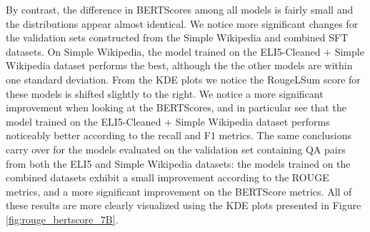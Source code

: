 \documentclass[11pt, oneside]{article}   	%
\begin{document}
By contrast, the difference in BERTScores among all models is fairly small and the distributions appear almost identical.
We notice more significant changes for the validation sets constructed from the Simple Wikipedia and combined SFT datasets.
On Simple Wikipedia, the model trained on the ELI5-Cleaned + Simple Wikipedia dataset performs the best, although the the other models are within one standard deviation.
From the KDE plots we notice the RougeLSum score for these models is shifted slightly to the right. 
We notice a more significant improvement when looking at the BERTScores, and in particular see that the model trained on the ELI5-Cleaned + Simple Wikipedia dataset performs noticeably better according to the recall and F1 metrics.
The same conclusions carry over for the models evaluated on the validation set containing QA pairs from both the ELI5 and Simple Wikipedia datasets: the models trained on the combined datasets exhibit a small improvement according to the ROUGE metrics, and a more significant improvement on the BERTScore metrics.
All of these results are more clearly visualized using the KDE plots presented in Figure \ref{fig:rouge_bertscore_7B}.


%
%
\end{document}
